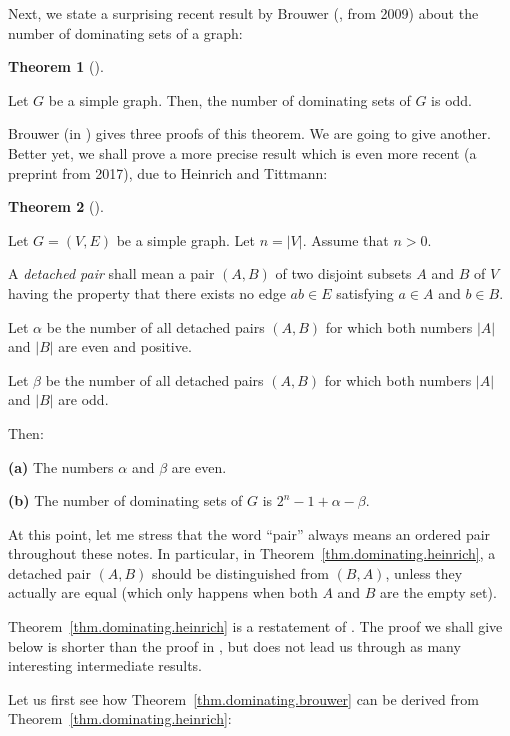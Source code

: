 \documentclass[numbers=enddot,12pt,final,onecolumn,notitlepage]{scrartcl}%
\theoremstyle{definition}
\newtheorem{theo}{Theorem}[subsection]
\newenvironment{theorem}[1][]
{\begin{theo}[#1]\begin{leftbar}}
{\end{leftbar}\end{theo}}
\newcommand{\abs}[1]{\left| #1 \right|}
\newcommand{\tup}[1]{\left( #1 \right)}
\begin{document}
Next, we state a surprising recent result by Brouwer (\cite{Brouwe09},
from 2009) about the number of dominating sets of a graph:

\begin{theorem} \label{thm.dominating.brouwer}
Let $G$ be a simple graph. Then, the number of dominating sets of $G$
is odd.
\end{theorem}

Brouwer (in \cite{Brouwe09}) gives three proofs of this theorem. We
are going to give another. Better yet, we shall prove a more
precise result which is even more recent (a preprint \cite{HeiTit17}
from 2017), due to Heinrich and Tittmann:

\begin{theorem} \label{thm.dominating.heinrich}
Let $G = \tup{V, E}$ be a simple graph. Let $n = \abs{V}$. Assume that
$n > 0$.

A \textit{detached pair} shall mean a pair $\tup{A, B}$ of two
disjoint subsets $A$ and $B$ of $V$ having the property that
there exists no edge $ab \in E$ satisfying
$a \in A$ and $b \in B$.

Let $\alpha$ be the number of all detached pairs $\tup{A, B}$ for
which both numbers $\abs{A}$ and $\abs{B}$ are even and positive.

Let $\beta$ be the number of all detached pairs $\tup{A, B}$ for
which both numbers $\abs{A}$ and $\abs{B}$ are odd.

Then:

\textbf{(a)} The numbers $\alpha$ and $\beta$ are even.

\textbf{(b)} The number of dominating sets of $G$ is
$2^n - 1 + \alpha - \beta$.
\end{theorem}

At this point, let me stress that the word ``pair'' always means an
ordered pair throughout these notes. In particular, in
Theorem~\ref{thm.dominating.heinrich}, a detached pair $\tup{A, B}$
should be distinguished from $\tup{B, A}$, unless they actually are
equal (which only happens when both $A$ and $B$ are the empty set).

Theorem~\ref{thm.dominating.heinrich} is a restatement of
\cite[Theorem 8]{HeiTit17}. The proof we shall give below is
shorter than the proof in \cite{HeiTit17}, but does not lead us
through as many interesting intermediate results.

Let us first see how Theorem~\ref{thm.dominating.brouwer} can be
derived from Theorem~\ref{thm.dominating.heinrich}:
\end{document}
